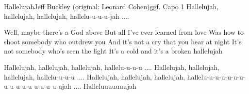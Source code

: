 \begin{song}{Hallelujah}{Jeff Buckley (original: Leonard Cohen)}{ggf. Capo 1}
Hallelujah, hallelujah, hallelujah, hallelu-u-u-u-jah ....

Well, maybe there's a God above
But all I've ever learned from love
Was how to shoot somebody who outdrew you
And it's not a cry that you hear at night
It's not somebody who's seen the light
It's a cold and it's a broken hallelujah

Hallelujah, hallelujah, hallelujah, hallelu-u-u-u ....
Hallelujah, hallelujah, hallelujah, hallelu-u-u-u ....
Hallelujah, hallelujah, hallelujah, hallelu-u-u-u-u-u-u-u-u-u-u-u-u-u-u-u-ujah ....
Halleluuuuuuujah
\end{song}
